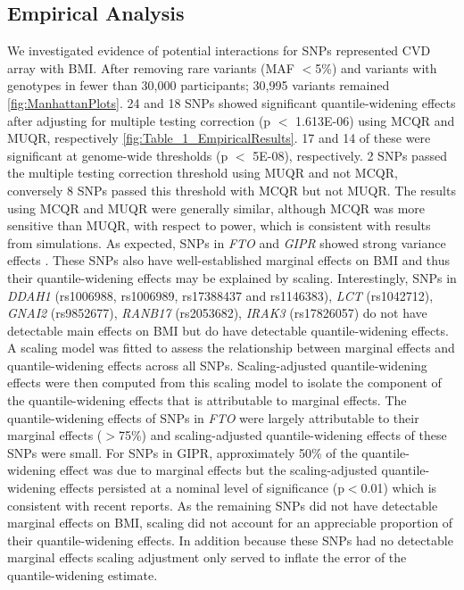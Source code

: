 \documentclass[12pt]{article}
\begin{document}
\subsection{Empirical Analysis}
We investigated evidence of potential interactions for SNPs represented CVD array with BMI. After removing rare variants (MAF $<$5\%) and variants with genotypes in fewer than 30,000 participants; 30,995 variants remained \ref{fig:ManhattanPlots}. 24 and 18 SNPs showed significant quantile-widening effects after adjusting for multiple testing correction (p $<$ \num{1.613E-06}) using MCQR and MUQR, respectively \ref{fig:Table_1_EmpiricalResults}. 17 and 14 of these were significant at genome-wide thresholds (p $<$ \num{5E-08}), respectively. 2 SNPs passed the multiple testing correction threshold using MUQR and not MCQR, conversely 8 SNPs passed this threshold with MCQR but not MUQR. The results using MCQR and MUQR were generally similar, although MCQR was more sensitive than MUQR, with respect to power, which is consistent with results from simulations. As expected, SNPs in \textit{FTO} and \textit{GIPR} showed strong variance effects \cite{abadi2017penetrance,Young:2018ej}. These SNPs also have well-established marginal effects on BMI and thus their quantile-widening effects may be explained by scaling. Interestingly, SNPs in \textit{DDAH1} (rs1006988, rs1006989, rs17388437 and rs1146383), \textit{LCT} (rs1042712), \textit{GNAI2} (rs9852677), \textit{RANB17} (rs2053682), \textit{IRAK3} (rs17826057) do not have detectable main effects on BMI but do have detectable quantile-widening effects. A scaling model was fitted to assess the relationship between marginal effects and quantile-widening effects across all SNPs. Scaling-adjusted quantile-widening effects were then computed from this scaling model to isolate the component of the quantile-widening effects that is attributable to marginal effects. The quantile-widening effects of SNPs in \textit{FTO} were largely attributable to their marginal effects ($>$75\%) and scaling-adjusted quantile-widening effects of these SNPs were small. For SNPs in GIPR, approximately 50\% of the quantile-widening effect was due to marginal effects but the scaling-adjusted quantile-widening effects persisted at a nominal level of significance (p$<$0.01) which is consistent with recent reports.\cite{Young:2018ej} As the remaining SNPs did not have detectable marginal effects on BMI, scaling did not account for an appreciable proportion of their quantile-widening effects. In addition because these SNPs had no detectable marginal effects scaling adjustment only served to inflate the error of the quantile-widening estimate.
\end{document}
